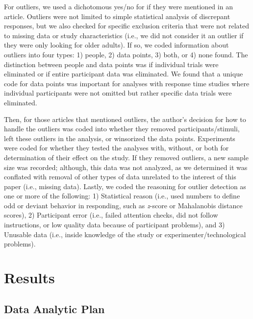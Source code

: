 \documentclass[english,man]{apa6}
\theoremstyle{definition}
\theoremstyle{definition}
\theoremstyle{definition}
\theoremstyle{remark}
\begin{document}
For outliers, we used a dichotomous yes/no for if they were mentioned in
an article. Outliers were not limited to simple statistical analysis of
discrepant responses, but we also checked for specific exclusion
criteria that were not related to missing data or study characteristics
(i.e., we did not consider it an outlier if they were only looking for
older adults). If so, we coded information about outliers into four
types: 1) people, 2) data points, 3) both, or 4) none found. The
distinction between people and data points was if individual trials were
eliminated or if entire participant data was eliminated. We found that a
unique code for data points was important for analyses with response
time studies where individual participants were not omitted but rather
specific data trials were eliminated.

Then, for those articles that mentioned outliers, the author's decision
for how to handle the outliers was coded into whether they removed
participants/stimuli, left these outliers in the analysis, or winsorized
the data points. Experiments were coded for whether they tested the
analyses with, without, or both for determination of their effect on the
study. If they removed outliers, a new sample size was recorded;
although, this data was not analyzed, as we determined it was conflated
with removal of other types of data unrelated to the interest of this
paper (i.e., missing data). Lastly, we coded the reasoning for outlier
detection as one or more of the following: 1) Statistical reason (i.e.,
used numbers to define odd or deviant behavior in responding, such as
\emph{z}-score or Mahalanobis distance scores), 2) Participant error
(i.e., failed attention checks, did not follow instructions, or low
quality data because of participant problems), and 3) Unusable data
(i.e., inside knowledge of the study or experimenter/technological
problems).

\section{Results}\label{results}

\subsection{Data Analytic Plan}\label{data-analytic-plan}
\end{document}
